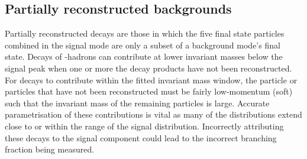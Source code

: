 


\subsection{Partially reconstructed backgrounds}
\label{sec:B2DsKK_partrecocomps}

Partially reconstructed decays are those in which the five final state particles combined in the signal mode are only a subset of a background mode's final state.
Decays of \bquark-hadrons can contribute at lower invariant masses below the signal peak when one or more the decay products have not been reconstructed. 
For decays to contribute within the fitted \Bp invariant mass window, the particle or particles that have not been reconstructed must be fairly low-momentum (soft) such that the invariant mass of the remaining particles is large. Accurate parametrisation of these contributions is vital as many of the distributions extend close to or within the range of the signal distribution. Incorrectly attributing these decays to the signal component could lead to the incorrect branching fraction being measured. 

